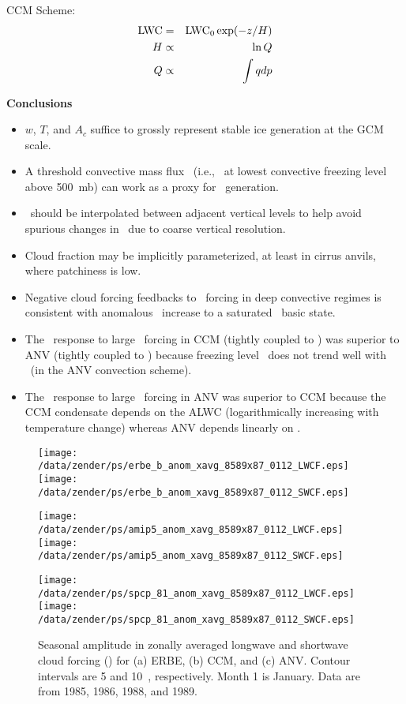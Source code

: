 \documentclass[agupp]{aguplus}
\begin{document}
CCM Scheme:
\begin{eqnarray}
\mbox{\textrm{LWC}} & = & \mbox{\textrm{LWC}}_0 \exp (-z/H) \\
H & \propto & \ln Q \\
Q & \propto & \int q dp
\end{eqnarray}

\normalsize
\pagebreak

\begin{center}
\Large
\textbf{Conclusions} 
\end{center}

\medskip

\begin{itemize}
\Large
\item $w$, $T$, and $A_c$ suffice to grossly represent stable ice
generation at the GCM scale. 
\item A threshold convective mass flux \Mc\ (i.e., \Mc\ at lowest
convective freezing level above 500~mb) can work as a proxy for \IWP\
generation. 
\item \Mc\ should be interpolated between adjacent vertical levels
to help avoid spurious changes in \Mc\ due to coarse vertical
resolution. 
\item Cloud fraction may be implicitly parameterized, at least in
cirrus anvils, where patchiness is low.  
\item Negative cloud forcing feedbacks to \SST\ forcing in deep
convective regimes is consistent with anomalous \SWCF\ increase to a
saturated \LWCF\ basic state.
\item The \LWCF\ response to large \SST\ forcing in CCM 
(tightly coupled to \SST) was superior to ANV (tightly
coupled to \Mc) because freezing level \Mc\ does not trend well 
with \SST\ (in the ANV convection scheme).
\item The \SWCF\ response to large \SST\ forcing in ANV was superior
to CCM because the CCM condensate depends on the ALWC (logarithmically
increasing with temperature change) whereas ANV depends linearly on \Mc.
\end{itemize}

\normalsize
\pagebreak

\begin{figure*}
\texttt{[image: /data/zender/ps/erbe\_b\_anom\_xavg\_8589x87\_0112\_LWCF.eps]}
\texttt{[image: /data/zender/ps/erbe\_b\_anom\_xavg\_8589x87\_0112\_SWCF.eps]}

\texttt{[image: /data/zender/ps/amip5\_anom\_xavg\_8589x87\_0112\_LWCF.eps]}
\texttt{[image: /data/zender/ps/amip5\_anom\_xavg\_8589x87\_0112\_SWCF.eps]}

\texttt{[image: /data/zender/ps/spcp\_81\_anom\_xavg\_8589x87\_0112\_LWCF.eps]}
\texttt{[image: /data/zender/ps/spcp\_81\_anom\_xavg\_8589x87\_0112\_SWCF.eps]}
\caption{Seasonal amplitude in zonally averaged longwave and shortwave
cloud forcing (\wxmS ) for (a) ERBE, (b) CCM, and
(c) ANV. 
Contour intervals are 5 and 10~\wxmS, respectively. 
Month 1 is January. 
Data are from 1985, 1986, 1988, and 1989.
\label{fig:anom_xavg_8589x87_0112}}   
\end{figure*}
\end{document}
